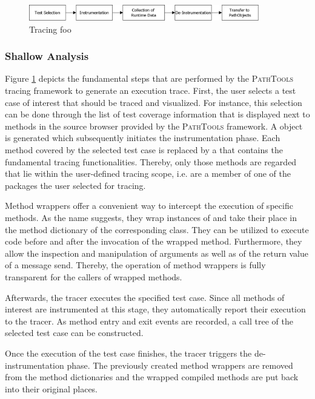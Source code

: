 \begin{figure}[tb]
	\centering
	\includegraphics[width=0.9\textwidth]{../images/02-TracingProcess}
	\caption[TOC Caption]{Tracing foo}
	\label{fig:ImplementationTracing}
\end{figure}

\subsubsection{Shallow Analysis}
Figure \ref{fig:ImplementationTracing} depicts the fundamental steps that are performed by the \textsc{PathTools} tracing framework to generate an execution trace.
First, the user selects a test case of interest that should be traced and visualized.
For instance, this selection can be done through the list of test coverage information that is displayed next to methods in the source browser provided by the \textsc{PathTools} framework.
A  object is generated which subsequently initiates the instrumentation phase.
Each method covered by the selected test case is replaced by a  that contains the fundamental tracing functionalities.
Thereby, only those methods are regarded that lie within the user-defined tracing scope, i.e. are a member of one of the packages the user selected for tracing.

Method wrappers \cite{brant_wrappers_1998} offer a convenient way to intercept the execution of specific methods.
As the name suggests, they wrap instances of  and take their place in the method dictionary of the corresponding class.
They can be utilized to execute code before and after the invocation of the wrapped method.
Furthermore, they allow the inspection and manipulation of arguments as well as of the return value of a message send.
Thereby, the operation of method wrappers is fully transparent for the callers of wrapped methods.

Afterwards, the tracer executes the specified test case.
Since all methods of interest are instrumented at this stage, they automatically report their execution to the tracer.
As method entry and exit events are recorded, a call tree of the selected test case can be constructed.

Once the execution of the test case finishes, the tracer triggers the de-instrumentation phase.
The previously created method wrappers are removed from the method dictionaries and the wrapped compiled methods are put back into their original places.

